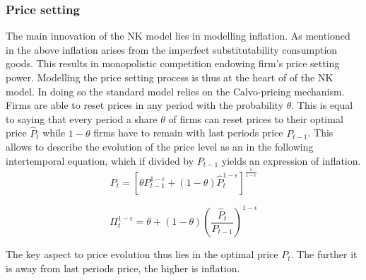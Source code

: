 \documentclass[12pt,a4paper,english]{article} %
\begin{document}
	\subsubsection{Price setting}
	The main innovation of the NK model lies in modelling inflation. As mentioned in the above inflation arises from the imperfect substitutability consumption goods. This results in monopolistic competition endowing firm's price setting power. Modelling the price setting process is thus at the heart of of the NK model. In doing so the standard model relies on the Calvo-pricing mechanism. Firms are able to reset prices in any period with the probability $\theta$. This is equal to saying that every period a share $\theta$ of firms can reset prices to their optimal price $\hat{P}_t$ while $1-\theta$ firms have to remain with last periods price $P_{t-1}$. This allows to describe the evolution of the price level as an in the following intertemporal equation, which if divided by $P_{t-1}$ yields an expression of inflation.
	\begin{equation}
		P_t = 
		\left[
		\theta P_{t-1}^{1 - \epsilon} + (1 - \theta) \hat{P}_t^{1 - \epsilon}
		\right]^{\frac{1}{1 - \epsilon}}
	\end{equation}

	\begin{equation} \label{eq: inlfation}
		\Pi_t^{1-\epsilon} = \theta + (1 - \theta) \left(\frac{\hat{P}_t}{P_{t-1}} \right)^{1-\epsilon}
	\end{equation}

	The key aspect to price evolution thus lies in the optimal price $\hat{P_t}$. The further it is away from last periods price, the higher is inflation. \\
	
\end{document}
